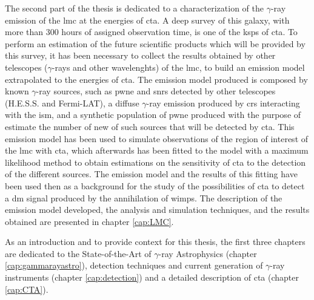\documentclass[main.tex]{subfiles}
\begin{document}
The second part of the thesis is dedicated to a characterization of the $\gamma$-ray emission of the \gls{lmc} at the energies of \gls{cta}. A deep survey of this galaxy, with more than 300 hours of assigned observation time, is one of the \glspl{ksp} of \gls{cta}. To perform an estimation of the future scientific products which will be provided by this survey, it has been necessary to collect the results obtained by other telescopes ($\gamma$-rays and other wavelenghts) of the \gls{lmc}, to build an emission model extrapolated to the energies of \gls{cta}. The emission model produced is composed by known $\gamma$-ray sources, such as \gls{pwne} and \glspl{snr} detected by other telescopes (H.E.S.S. and Fermi-LAT), a diffuse $\gamma$-ray emission produced by \glspl{cr} interacting with the \gls{ism}, and a synthetic population of \gls{pwne} produced with the purpose of estimate the number of new of such sources that will be detected by \gls{cta}. This emission model has been used to simulate observations of the region of interest of the \gls{lmc} with \gls{cta}, which afterwards has been fitted to the model with a maximum likelihood method to obtain estimations on the sensitivity of \gls{cta} to the detection of the different sources. The emission model and the results of this fitting have been used then as a background for the study of the possibilities of \gls{cta} to detect a \gls{dm} signal produced by the annihilation of \glspl{wimp}. The description of the emission model developed, the analysis and simulation techniques, and the results obtained are presented in chapter \ref{cap:LMC}.

As an introduction and to provide context for this thesis, the first three chapters are dedicated to the State-of-the-Art of $\gamma$-ray Astrophysics (chapter \ref{cap:gammarayastro}), detection techniques and current generation of $\gamma$-ray instruments (chapter \ref{cap:detection}) and a detailed description of \gls{cta} (chapter \ref{cap:CTA}).
\end{document}
